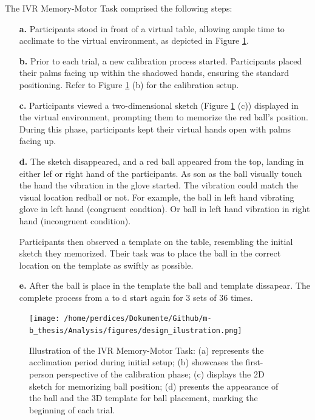 \documentclass[12pt,oneside,openright]{report}
\begin{document}
The IVR Memory-Motor Task comprised the following steps:
\begin{enumerate}
    \item[\textbf{a.}] Participants stood in front of a virtual table, allowing ample time to acclimate to the virtual environment, as depicted in Figure \ref{fig:looks}.
    
    \item[\textbf{b.}] Prior to each trial, a new calibration process started. Participants placed their palms facing up within the shadowed hands, ensuring the standard positioning. Refer to Figure \ref{fig:looks} (b) for the calibration setup.
    
    \item[\textbf{c.}] Participants viewed a two-dimensional sketch (Figure \ref{fig:looks} (c)) displayed in the virtual environment, prompting them to memorize the red ball's position. During this phase, participants kept their virtual hands open with palms facing up.
    
    \item[\textbf{d.}] The sketch disappeared, and a red ball appeared from the top, landing in either lef or right hand of the participants. As son as the ball visually touch the hand the vibration in the glove started. The vibration could match the visual location redball or not. For example, the ball in left hand vibrating glove in left hand (congruent condtion). Or ball in left hand vibration in right hand (incongruent condition). 
    
    Participants then observed a template on the table, resembling the initial sketch they memorized. Their task was to place the ball in the correct location on the template as swiftly as possible.

    \item[\textbf{e.}] After the ball is place in the template the ball and template dissapear. The complete process from a to d start again for 3 sets of 36 times. 
    
\end{enumerate}

\begin{figure}[!ht]
    \centering
    \texttt{[image: /home/perdices/Dokumente/Github/m-b\_thesis/Analysis/figures/design\_ilustration.png]}
    \caption{Illustration of the IVR Memory-Motor Task: (a) represents the acclimation period during initial setup; (b) showcases the first-person perspective of the calibration phase; (c) displays the 2D sketch for memorizing ball position; (d) presents the appearance of the ball and the 3D template for ball placement, marking the beginning of each trial.}
    \label{fig:looks}
\end{figure}
 
\end{document}
